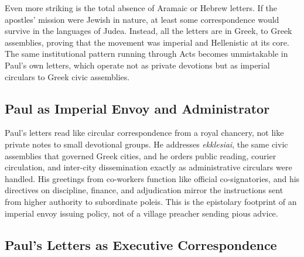 Even more striking is the total absence of Aramaic or Hebrew letters.
If the apostles' mission were Jewish in nature, at least some correspondence would survive in the languages of Judea.
Instead, all the letters are in Greek, to Greek assemblies, proving that the movement was imperial and Hellenistic at its core.
The same institutional pattern running through Acts becomes unmistakable in Paul's own letters, which operate not as private devotions but as imperial circulars to Greek civic assemblies.

\subsection{Paul as Imperial Envoy and Administrator}\label{subsec:pauls-letters-as-state-correspondence.}

Paul's letters read like circular correspondence from a royal chancery, not like private notes to small devotional groups.
He addresses \textit{ekklesiai}, the same civic assemblies that governed Greek cities, and he orders public reading, courier circulation, and inter-city dissemination exactly as administrative circulars were handled.
His greetings from co-workers function like official co-signatories, and his directives on discipline, finance, and adjudication mirror the instructions sent from higher authority to subordinate poleis.
This is the epistolary footprint of an imperial envoy issuing policy, not of a village preacher sending pious advice.

\subsection{Paul's Letters as Executive Correspondence}\label{subsec:pauls-letters-as-executive-correspondence}

